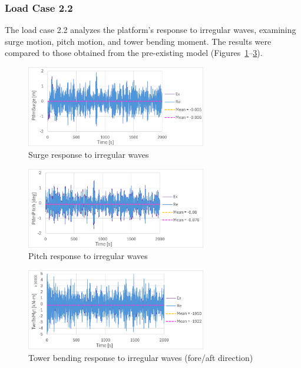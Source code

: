 \documentclass[a4paper, 11pt]{article}
\begin{document}
\subsubsection{Load Case 2.2}
\hspace*{0.5cm}The load case 2.2 analyzes the platform's response to irregular waves, examining surge motion, pitch motion, and tower bending moment. The results were compared to those obtained from the pre-existing model (Figures~\ref{fig:2.2_surge_mine}--\ref{fig:2.2_twr_mine}). 

\begin{figure}[H]
    \centering
    \includegraphics[width=0.7\textwidth]{2.2_surge_mine.png}
    \caption{\small Surge response to irregular waves}
    \label{fig:2.2_surge_mine}
\end{figure}

\begin{figure}[H]
    \centering
    \includegraphics[width=0.7\textwidth]{2.2_pitch_mine.png}
    \caption{\small Pitch response to irregular waves}
    \label{fig:2.2_pitch_mine}
\end{figure}

\begin{figure}[H]
    \centering
    \includegraphics[width=0.7\textwidth]{2.2_twr_mine.png}
    \caption{\small Tower bending response to irregular waves (fore/aft direction)}
    \label{fig:2.2_twr_mine}
\end{figure}
\end{document}
